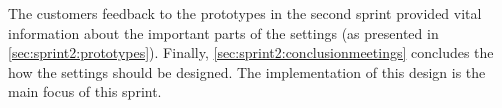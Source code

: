 The customers feedback to the prototypes in the second sprint provided vital information about the important parts of the settings (as presented in \cref{sec:sprint2:prototypes}).
Finally, \cref{sec:sprint2:conclusionmeetings} concludes the how the settings should be designed.
The implementation of this design is the main focus of this sprint.
